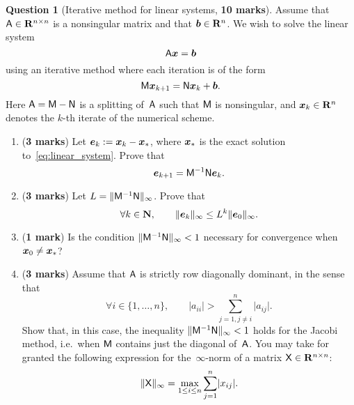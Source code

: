 \documentclass[11pt]{article}
\theoremstyle{definition}
\newtheorem{question}{Question}
\theoremstyle{remark}
\begin{document}
\newpage
\begin{question}
    [Iterative method for linear systems, \textbf{10 marks}]
    Assume that $\mathsf A \in \mathbf R^{n \times n}$ is a nonsingular matrix and that $\mathbf{\boldsymbol{b}} \in \mathbf R^n$.
    We wish to solve the linear system
    \begin{equation}
        \label{eq:linear_system}
        \mathsf A \mathbf{\boldsymbol{x}} = \mathbf{\boldsymbol{b}}
    \end{equation}
    using an iterative method where each iteration is of the form
    \begin{equation}
        \label{eq:iterative_scheme}
        \mathsf M \mathbf{\boldsymbol{x}}_{k+1} = \mathsf N \mathbf{\boldsymbol{x}}_k + \mathbf{\boldsymbol{b}}.
    \end{equation}
    Here $\mathsf A = \mathsf M - \mathsf N$ is a splitting of~$\mathsf A$ such that $\mathsf M$ is nonsingular,
    and $\mathbf{\boldsymbol{x}}_k \in \mathbf R^n$ denotes the $k$-th iterate of the numerical scheme.

    \begin{enumerate}
        \item
            (\textbf{3 marks})
            Let $\mathbf{\boldsymbol{e}}_k := \mathbf{\boldsymbol{x}}_k - \mathbf{\boldsymbol{x}}_*$,
            where $\mathbf{\boldsymbol{x}}_*$ is the exact solution to~\eqref{eq:linear_system}.
            Prove that
            \[
                \mathbf{\boldsymbol{e}}_{k+1} = \mathsf M^{-1} \mathsf N \mathbf{\boldsymbol{e}}_k.
            \]

        \item
            (\textbf{3 marks})
            Let $L = \lVert\mathsf M^{-1} \mathsf N\rVert_{\infty}$.
            Prove that
            \[
                \forall k \in \mathbf N, \qquad
                \lVert\mathbf{\boldsymbol{e}}_k\rVert_{\infty} \leq L^k \lVert\mathbf{\boldsymbol{e}}_0\rVert_{\infty}.
            \]

        \item
            (\textbf{1 mark})
            Is the condition $\lVert\mathsf M^{-1} \mathsf N\rVert_{\infty} < 1$ necessary
            for convergence when $\mathbf{\boldsymbol{x}}_0 \neq \mathbf{\boldsymbol{x}}_*$?

        \item
            (\textbf{3 marks})
            Assume that $\mathsf A$ is strictly row diagonally dominant, in the sense that
            \[
                \forall i \in \{1, \dotsc, n\}, \qquad
                \lvert a_{ii} \rvert > \sum_{j=1, j\neq i}^{n} \lvert a_{ij} \rvert.
            \]
            Show that, in this case, the inequality $\lVert\mathsf M^{-1} \mathsf N\rVert_{\infty} < 1$ holds for the Jacobi method,
            i.e.\ when $\mathsf M$ contains just the diagonal of~$\mathsf A$.
            You may take for granted the following expression for the~$\infty$-norm of a matrix $\mathsf X \in \mathbf R^{n \times n}$:
            \[
                \lVert\mathsf X\rVert_{\infty} = \max_{1 \leq i \leq n} \sum_{j=1}^{n} \lvert x_{ij}\rvert.
            \]


\end{enumerate}
\end{question}
\end{document}
